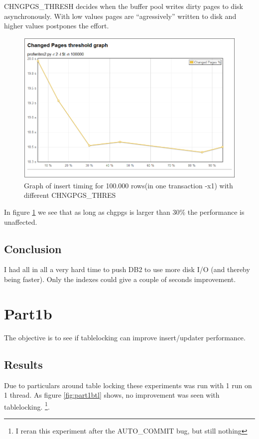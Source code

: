 CHNGPGS\_THRESH decides when the buffer pool writes dirty pages to disk
 asynchronously. With low values pages are ``agressively'' written to disk and
 higher values postpones the effort.
\begin{figure}
  \centering
  \includegraphics[width=12cm]{assignment2/chpgs}
  \caption[Insert performance - chgpgs]{Graph of insert timing for 100.000 rows(in one
  transaction -x1) with different CHNGPGS\_THRES}\label{fig:part1achgs}
\end{figure}
In figure \ref{fig:part1achgs} we see that as long as chgpgs is larger than 30\%
the performance is unaffected.
\subsection{Conclusion}
I had all in all a very hard time to push DB2 to use more disk I/O (and thereby
being faster). Only the indexes could give a couple of seconds improvement.

\section{Part1b}
The objective is to see if tablelocking can improve insert/updater performance.
\subsection{Results}
Due to particulars around table locking these experiments was run with 1 run on
1 thread. As figure \ref{fig:part1btl} shows, no improvement was seen with
tablelocking. \footnote{I reran this experiment after the AUTO\_COMMIT bug, but
still nothing}.

